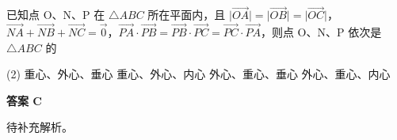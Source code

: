 \begin{choice}[source={必修二P52页习题}, topic={三角形的外心重心垂心}]
已知点 O、N、P 在 $\triangle ABC$ 所在平面内，且 $\lvert\overrightarrow{OA}\rvert=\lvert\overrightarrow{OB}\rvert=\lvert\overrightarrow{OC}\rvert$，$\overrightarrow{NA} + \overrightarrow{NB} + \overrightarrow{NC} = \vec{0}$，$\overrightarrow{PA} \cdot \overrightarrow{PB} = \overrightarrow{PB} \cdot \overrightarrow{PC} = \overrightarrow{PC} \cdot \overrightarrow{PA}$，则点 O、N、P 依次是 $\triangle ABC$ 的
\begin{tasks}(2)
	\task 重心、外心、垂心
	\task 重心、外心、内心
	\task 外心、重心、垂心
	\task 外心、重心、内心
\end{tasks}
\end{choice}
\begin{choice-sol}
\textbf{答案 C}

待补充解析。
\end{choice-sol}
